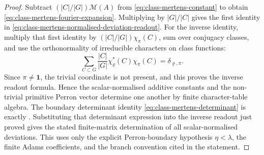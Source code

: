 \begin{proof}
  Subtract \((|C|/|G|)\mathcal M(A)\) from
  \eqref{eq:class-mertens-constant} to obtain
  \eqref{eq:class-mertens-fourier-expansion}.
  Multiplying by \(|G|/|C|\) gives the first identity in
  \eqref{eq:class-mertens-normalised-deviation-readout}.  For the inverse
  identity, multiply that first identity by \((|C|/|G|)\chi_\pi(C)\), sum over
  conjugacy classes, and use the orthonormality of irreducible characters on
  class functions:
  \[
    \sum_{C\subset G}\frac{|C|}{|G|}
      \chi_\varrho^\ast(C)\chi_\pi(C)=\delta_{\varrho,\pi}.
  \]
  Since \(\pi\neq\mathbf1\), the trivial coordinate is not present, and this
  proves the inverse readout formula.  Hence the scalar-normalised additive
  constants and the non-trivial primitive Perron vector determine one another
  by finite character-table algebra.
  The boundary determinant identity
  \eqref{eq:class-mertens-determinant} is exactly
  .  Substituting that
  determinant expression into the inverse readout just proved gives the stated
  finite-matrix determination of all scalar-normalised deviations.  This uses
  only the explicit Perron-boundary hypothesis \(\eta<\lambda\), the finite
  Adams coefficients, and the branch convention cited in the statement.
\end{proof}


